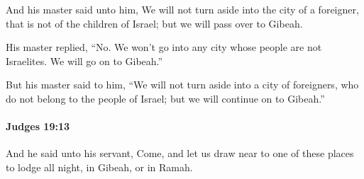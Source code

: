 			\begin{versebox}
					\item[BHS] 
					\item[ASV] And his master said unto him, We will not turn aside into the city of a foreigner, that is not of the children of Israel; but we will pass over to Gibeah.
					\item[NIV] His master replied, “No. We won’t go into any city whose people are not Israelites. We will go on to Gibeah.”
					\item[NRSV] But his master said to him, “We will not turn aside into a city of foreigners, who do not belong to the people of Israel; but we will continue on to Gibeah.”
			\end{versebox}

		\paragraph{Judges 19:13} %
			\label{JUDGES-19-13}

			And he said unto his servant, Come, and let us draw near to one of these places to lodge all night, in Gibeah, or in Ramah.


